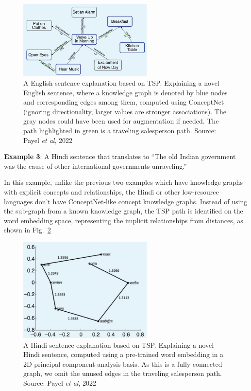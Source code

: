 \documentclass[]{article}
\newcommand{\etal}{\textit{et al}}
\begin{document}
\begin{figure}[htbp]
\centering
\includegraphics[width=0.6\textwidth]{FIGS/eng_tsp.png}
\caption{A English sentence explanation based on TSP. Explaining a novel English sentence, where a knowledge graph is denoted by blue nodes and corresponding edges among them, computed using ConceptNet (ignoring directionality, larger values are stronger associations). The gray nodes could have been used for augmentation if needed. The path highlighted in green is a traveling salesperson path. Source: Payel \etal, 2022\cite{b1}}
\label{eng-tsp}
\end{figure}

\vspace{0.5cm}
\noindent\textbf{Example 3}: A Hindi sentence that translates to “The old Indian government was the cause of other international governments unraveling.”

In this example, unlike the previous two examples which have knowledge graphs with explicit concepts and relationships, the Hindi or other low-resource languages don't have ConceptNet-like concept knowledge graphs. 
Instead of using the sub-graph from a known knowledge graph, the TSP path is identified on the word embedding space\cite{b5}, representing the implicit relationships from distances, as shown in Fig.~\ref{hindi-tsp}
 
\begin{figure}[htbp]
\centering
\includegraphics[width=0.6\textwidth]{FIGS/hindi_tsp.png}
\caption{A Hindi sentence explanation based on TSP. Explaining a novel Hindi sentence, computed using a pre-trained word embedding in a 2D principal component analysis basis. As this is a fully connected graph, we omit the unused edges in the traveling salesperson path. Source: Payel \etal, 2022\cite{b1}}
\label{hindi-tsp}
\end{figure}
\end{document}
